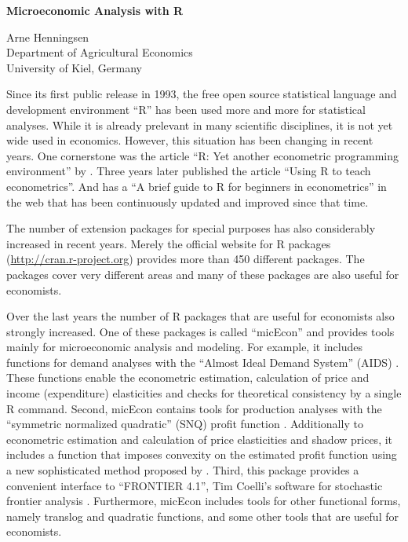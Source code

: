 \documentclass[12pt,english]{article}
\begin{document}
\begin{center}\textbf{\LARGE Microeconomic Analysis with R}\end{center}{\LARGE \par}

\begin{center}Arne Henningsen\\
Department of Agricultural Economics\\
University of Kiel, Germany\end{center}

Since its first public release in 1993, the free open source statistical
language and development environment ``R'' \citep{r-project} has been used more
and more for statistical analyses. 
While it is already prelevant in many scientific disciplines, 
it is not yet wide used in economics.
However, this situation has been changing in recent years. 
One cornerstone was the article ``R: Yet another econometric programming
environment'' by \citet{cribari99}.
Three years later \citet{racine02} published the article ``Using R to teach
econometrics''. 
And \citet{arai02} has a ``A brief guide to R for beginners in econometrics''
in the web that has been continuously updated and improved since that time.

The number of extension packages for special purposes has also considerably 
increased in recent years.
Merely the official website for R packages (\url{http://cran.r-project.org})
provides more than 450 different packages.
The packages cover very different areas and many of these packages are also 
useful for economists.

Over the last years the number of R packages that are useful for economists
also strongly increased. 
One of these packages is called ``micEcon'' \citep{r-micecon} and provides
tools mainly for microeconomic analysis and modeling.
For example, it includes functions for demand analyses with the 
``Almost Ideal Demand System'' (AIDS) \citep{deaton80a}.
These functions enable the econometric estimation, calculation of price and
income (expenditure) elasticities and checks for theoretical consistency
by a single R command.
Second, micEcon contains tools for production analyses with the 
``symmetric normalized quadratic'' (SNQ) profit function
\citep{diewert87,diewert92,kohli93}.  
Additionally to econometric estimation and calculation of price elasticities
and shadow prices, it includes a function that imposes convexity on the 
estimated profit function using a new sophisticated method proposed by
\citet{koebel03}.
Third, this package provides a convenient interface to ``FRONTIER 4.1'', Tim
Coelli's software for stochastic frontier analysis \citep{coelli96}.
Furthermore, micEcon includes tools for other functional forms, namely
translog and quadratic functions, and some other tools that are useful
for economists.
\end{document}
